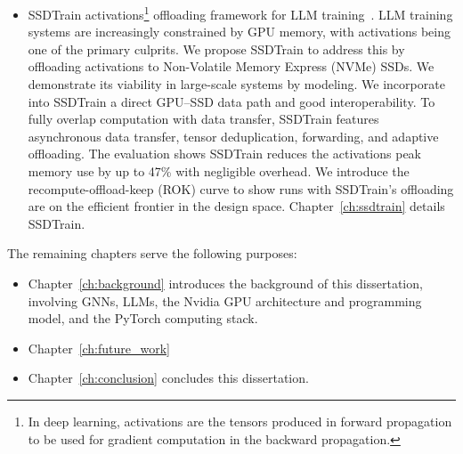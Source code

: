 \begin{itemize}
\item SSDTrain activations\footnote{In deep learning, activations are the tensors produced in forward propagation to be used for gradient computation in the backward propagation.} offloading framework for LLM training~\cite{wuTBAFasterLarge2024}.  LLM training systems are increasingly constrained by GPU memory, with activations being one of the primary culprits. We propose SSDTrain to address this by offloading activations to Non-Volatile Memory Express (NVMe) SSDs. We demonstrate its viability in large-scale systems by modeling. We incorporate into SSDTrain a direct GPU–SSD data path and good interoperability. To fully overlap computation with data transfer, SSDTrain features asynchronous data transfer, tensor deduplication, forwarding, and adaptive offloading. The evaluation shows SSDTrain reduces the activations peak memory use by up to 47\% with negligible overhead. We introduce the recompute-offload-keep (ROK) curve to show runs with SSDTrain's offloading are on the efficient frontier in the design space.  Chapter~\ref{ch:ssdtrain} details SSDTrain.
\end{itemize}



The remaining chapters serve the following purposes:

\begin{itemize}
    \item Chapter~\ref{ch:background} introduces the background of this dissertation, involving GNNs, LLMs, the Nvidia GPU architecture and programming model, and the PyTorch computing stack.
    \item Chapter~\ref{ch:future_work} 
    \item Chapter~\ref{ch:conclusion} concludes this dissertation.
\end{itemize}
